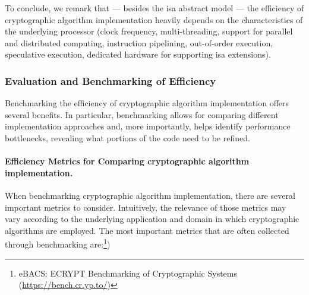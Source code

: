 
To conclude, we remark that --- besides the \gls{isa} abstract model --- the efficiency of cryptographic algorithm implementation heavily depends on the characteristics of the underlying processor (clock frequency, multi-threading, support for parallel and distributed computing, instruction pipelining, out-of-order execution, speculative execution, dedicated hardware for supporting \gls{isa} extensions). 



\subsubsection{Evaluation and Benchmarking of Efficiency}\label{sec:security_of_cryptographic_algorithms:performance:evaluation}

Benchmarking the efficiency of cryptographic algorithm implementation offers several benefits. In particular, benchmarking allows for comparing different implementation approaches and, more importantly, helps identify performance bottlenecks, revealing what portions of the code need to be refined.


\paragraph*{Efficiency Metrics for Comparing cryptographic algorithm implementation.}

When benchmarking cryptographic algorithm implementation, there are several important metrics to consider. Intuitively, the relevance of those metrics may vary according to the underlying application and domain in which cryptographic algorithms are employed. The most important metrics that are often collected through benchmarking are:\footnote{eBACS: ECRYPT Benchmarking of Cryptographic Systems (\url{https://bench.cr.yp.to/})})

